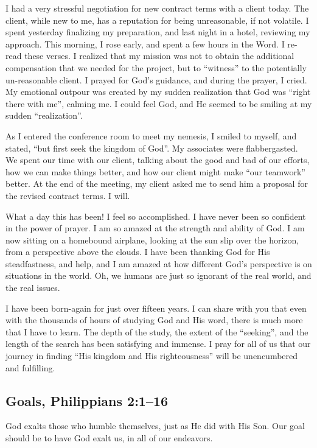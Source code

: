 \documentclass[12pt]{memoir}
\begin{document}
I had a very stressful negotiation for new contract terms with a client
today. The client, while new to me, has a reputation for being unreasonable,
if not volatile. I spent yesterday finalizing my preparation, and
last night in a hotel, reviewing my approach. This morning, I rose
early, and spent a few hours in the Word. I re-read these verses.
I realized that my mission was not to obtain the additional compensation
that we needed for the project, but to ``witness'' to the potentially
un-reasonable client. I prayed for God's guidance, and during the
prayer, I cried. My emotional outpour was created by my sudden realization
that God was ``right there with me'', calming me. I could feel God,
and He seemed to be smiling at my sudden ``realization''. 

As I entered the conference room to meet my nemesis, I smiled to myself,
and stated, ``but first seek the kingdom of God''. My associates
were flabbergasted. We spent our time with our client, talking about
the good and bad of our efforts, how we can make things better, and
how our client might make ``our teamwork'' better. At the end of
the meeting, my client asked me to send him a proposal for the revised
contract terms. I will.

What a day this has been! I feel so accomplished. I have never been
so confident in the power of prayer. I am so amazed at the strength
and ability of God. I am now sitting on a homebound airplane, looking
at the sun slip over the horizon, from a perspective above the clouds.
I have been thanking God for His steadfastness, and help, and I am
amazed at how different God's perspective is on situations in the
world. Oh, we humans are just so ignorant of the real world, and the
real issues.

I have been born-again for just over fifteen years. I can share with
you that even with the thousands of hours of studying God and His
word, there is much more that I have to learn. The depth of the study,
the extent of the ``seeking'', and the length of the search has
been satisfying and immense. I pray for all of us that our journey
in finding ``His kingdom and His righteousness'' will be unencumbered
and fulfilling.

\subsection{Goals, Philippians 2:1--16}

God exalts those who humble themselves, just as He did with His Son.
Our goal should be to have God exalt us, in all of our endeavors. 
\end{document}

